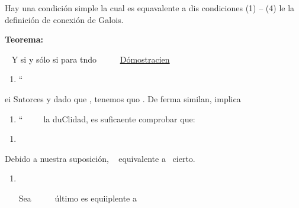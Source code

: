 \documentclass[12pt]{article}
\begin{document}
Hay una condici\'{o}n simple la cual es equavalente a dis condiciones (1) -- (4)
le la definici\'{o}n de conexi\'{o}n de Galois.

\textbf{Teorema:}

\ %
Y si y s\'{o}lo si para tndo \ %
\ %
\ %
\uline{D\'{o}mostracien}

\begin{enumerate}
	\item ``\ %
\ %
\end{enumerate}

ei %
Sntorces
y dado que
, tenemos quo
. De ferma similan,
implica

\begin{enumerate}
	\item ``\ %
\ %
\ %
la duClidad, es suficaente comprobar que:
\end{enumerate}
\begin{enumerate}
	\item \ %
\end{enumerate}

Debido a nuestra suposici\'{o}n, \ %
equivalente a\ %
cierto.

\begin{enumerate}
	\item \ %

Sea \ %
\ %
\ %
\'{u}ltimo es equiiplente a    
\end{enumerate}
\end{document}
